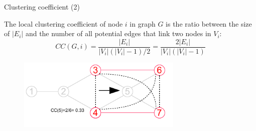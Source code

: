 \begin{frame}{Clustering coefficient (2)}

\begin{definition}
The \alert{local clustering coefficient} of node $i$ in graph $G$ is the
  ratio between the size of $|E_i|$ and the number of all potential edges
  that link two nodes in $V_i$:
  \[
     CC(G,i) = \frac{|E_i|}{|V_i|(|V_i|-1)/2} = \frac{2|E_i|}{|V_i|(|V_i|-1)}
  \]
\end{definition}

\begin{figure}
\includegraphics[width=0.7\textwidth]{figs/08/induced3}
\end{figure}

\end{frame}

